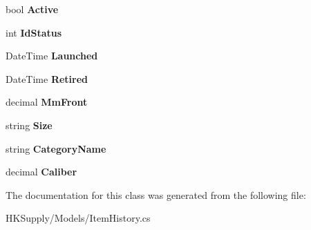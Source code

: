 \begin{DoxyCompactItemize}
bool {\bfseries Active}
\item 
\mbox{\label{class_h_k_supply_1_1_models_1_1_item_history_af37f7696f6ad3a08a6ea67f3d85952f9}} 
int {\bfseries Id\+Status}
\item 
\mbox{\label{class_h_k_supply_1_1_models_1_1_item_history_a6493a252e236e2d9e8b506e53f514898}} 
Date\+Time {\bfseries Launched}
\item 
\mbox{\label{class_h_k_supply_1_1_models_1_1_item_history_a0939cecc3a3fd6e51f498bdd8d1d9909}} 
Date\+Time {\bfseries Retired}
\item 
\mbox{\label{class_h_k_supply_1_1_models_1_1_item_history_a2594f93b0013650c8ecb66b75a62b271}} 
decimal {\bfseries Mm\+Front}
\item 
\mbox{\label{class_h_k_supply_1_1_models_1_1_item_history_ac08cb66a64ea52825f5cebaa7cb0b75d}} 
string {\bfseries Size}
\item 
\mbox{\label{class_h_k_supply_1_1_models_1_1_item_history_a1630b25446cff3f0d68d2d88059bd441}} 
string {\bfseries Category\+Name}
\item 
\mbox{\label{class_h_k_supply_1_1_models_1_1_item_history_abaca87b6a51f96564ca69054ec2fbf2b}} 
decimal {\bfseries Caliber}
\end{DoxyCompactItemize}


The documentation for this class was generated from the following file\+:\begin{DoxyCompactItemize}
\item 
H\+K\+Supply/\+Models/Item\+History.\+cs\end{DoxyCompactItemize}
